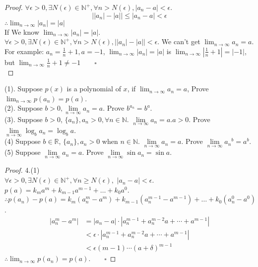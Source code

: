 \begin{proof}
$ \forall \epsilon>0, \exists N(\epsilon) \in \mathbb{N}^+, \forall n>N(\epsilon), |a_n - a| <\epsilon$. 
\begin{equation*}
	\Big| |a_n| - |a| \Big| \leqslant|a_n - a| <\epsilon
\end{equation*}
$ \therefore \lim_{n\rightarrow\infty} |a_n| = |a| $\\
If We know $ \lim_{n\rightarrow\infty} |a_n| = |a| $.\\
$ \forall \epsilon>0, \exists N(\epsilon) \in \mathbb{N}^+, \forall n>N(\epsilon), \big||a_n| - |a|\big| <\epsilon$.  We can't get $ \lim_{n\rightarrow\infty} a_n = a $. For example: $ a_n = \frac{1}{n}+1, a = -1 $, $ \lim_{n\rightarrow\infty} |a_n| = |a| $ is $ \lim_{n\rightarrow\infty} |\frac{1}{n}+1| = |-1| $, but $ \lim_{n\rightarrow\infty} \frac{1}{n}+1 \neq -1 \qquad\square $\\
\end{proof}

(1). Suppose $ p(x) $ is a polynomial of $ x $, if $ \lim_{n\rightarrow\infty} a_n = a $, Prove $ \lim_{n\rightarrow\infty} p(a_n) = p(a) $.\\
(2). Suppose $ b > 0, \lim\limits_{n\rightarrow\infty} a_n = a $. Prove $ b^{a_n} = b^a $.\\
(3). Suppose $ b>0 $, $ \{a_n\}, a_n>0,\forall n\in\mathbb{N} $. $ \lim\limits_{n\rightarrow\infty} a_n = a $.$ a>0 $. Prove $ \lim\limits_{n\rightarrow\infty} \log_{b} a_n = \log_{b} a$.\\
(4) Suppose $ b\in\mathbb{R} $, $ \{a_n\}, a_n>0 $ when $ n\in\mathbb{N} $. $ \lim\limits_{n\rightarrow\infty}a_n=a $. Prove $ \lim\limits_{n\rightarrow\infty} {a_n}^b = a^b $.\\
(5) Suppose  $ \lim\limits_{n\rightarrow\infty}a_n=a $. Prove $ \lim\limits_{n\rightarrow\infty}\sin{a_n} = \sin a $.\\
\begin{proof}4.(1)\\
	$ \forall \epsilon>0, \exists N(\epsilon) \in \mathbb{N}^+, \forall n \geqslant N(\epsilon), $
	$ |a_n-a| <\epsilon $.\\
	$ p(a) = k_{m}a^{m} + k_{m-1}a^{m-1} + \dots +  k_{0}a^{0} $.\\
	$ \therefore p(a_n) - p(a) =  k_{m}(a_n^{m}-a^{m}) + k_{m-1}(a_n^{m-1}-a^{m-1}) + \dots +  k_{0}(a_n^{0}-a^{0}) $.
	\begin{align*}
		|a_n^m - a^m| 
		&= |a_n-a|\cdot |a_n^{m-1} + a_n^{m-2}a + \cdots + a^{m-1}|\\
		&< \epsilon \cdot |a_n^{m-1} + a_n^{m-2}a + \cdots + a^{m-1}|\\
		&< \epsilon (m-1)\cdots(a+\delta)^{m-1}
	\end{align*}
	$ \therefore \lim_{n\rightarrow\infty} p(a_n) = p(a).\qquad\square  $  
\end{proof}


